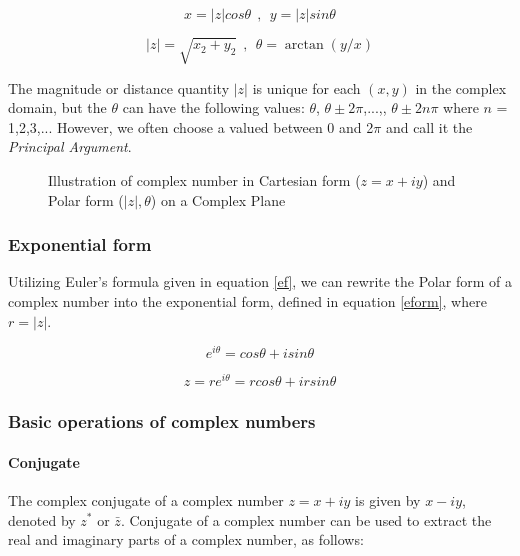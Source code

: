 \begin{equation}
x = |z|cos\theta  ~~,~~ y = |z|sin\theta 
\end{equation}

\begin{equation}
|z| = \sqrt{x_{2}+y_{2}}  ~~,~~ \theta = \arctan(y/x) 
\end{equation}

The magnitude or distance quantity $|z|$ is unique for each $(x,y)$ in the complex domain, but the $\theta$ can have the following values: $\theta$, $\theta \pm \mathrm{2}\pi$,...,, $\theta \pm \mathrm{2}n\pi$ where $n$ = 1,2,3,... However, we often choose a valued between $0$ and 2$\pi$ and call it the \textit{Principal Argument}.

\begin{figure}[htb]
	\centering
	\epsfxsize=5cm
	{}
	\caption{Illustration of complex number in Cartesian form ($z=x+iy$) and Polar form ($|z|,\theta$) on a Complex Plane}
	\label{fig:complexrep}
\end{figure}

\subsubsection{Exponential form}
Utilizing Euler's formula given in equation \ref{ef}, we can rewrite the Polar form of a complex number into the exponential form, defined in equation \ref{eform}, where $r = |z|$.


\begin{equation}\label{ef}
e^{i\theta} = cos\theta+isin\theta
\end{equation}

\begin{equation}\label{eform}
 z = re^{i\theta} = rcos\theta+irsin\theta
\end{equation}




\subsubsection{Basic operations of complex numbers }
\paragraph{Conjugate}
The complex conjugate of a complex number $z=x+iy$ is given by $x-iy$, denoted by $z^{*}$ or $\bar{z}$. Conjugate of a complex number can be used to extract the real and imaginary parts of a complex number, as follows:


